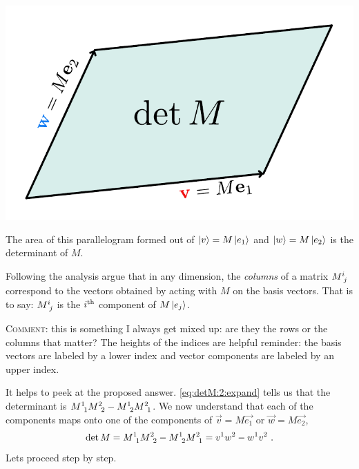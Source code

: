 \documentclass[12pt, oneside]{report}    %
\begin{document}
\begin{marginfigure}%
    \includegraphics[width=\textwidth]{figures/det ParallelogramDet.pdf}
    \caption{The area of this parallelogram formed out of $\left|v\right\rangle = M\left|e_1\right\rangle$ and $\left|w\right\rangle= M\left|e_2\right\rangle$ is the determinant of $M$.}
    \label{fig:det:area}
\end{marginfigure}
\begin{exercise}
Following the analysis argue that in any dimension, the \emph{columns} of a matrix $M\aij{i}{j}$ correspond to the vectors obtained by acting with $M$ on the basis vectors. That is to say: $M\aij{i}{j}$ is the $i^\textnormal{th}$ component of $M\left|e_j\right\rangle$. 

\textsc{Comment}: this is something I always get mixed up: are they the rows or the columns that matter? The heights of the indices are helpful reminder: the basis vectors are labeled by a lower index and vector components are labeled by an upper index.
\end{exercise}

It helps to peek at the proposed answer. \eqref{eq:detM:2:expand} tells us that the determinant is $M\aij{1}{1}M\aij{2}{2} - M\aij{1}{2} M\aij{2}{1}$. We now understand that each of the components maps onto one of the components of $\vec{v}=M\vec{e_1}$ or $\vec{w}=M\vec{e_2}$,
\begin{align}
    \det M = M\aij{1}{1}M\aij{2}{2} - M\aij{1}{2} M\aij{2}{1} 
    = v^1 w^2 - w^1 v^2 
    \ .
\end{align}
Lets proceed step by step. 
\end{document}
